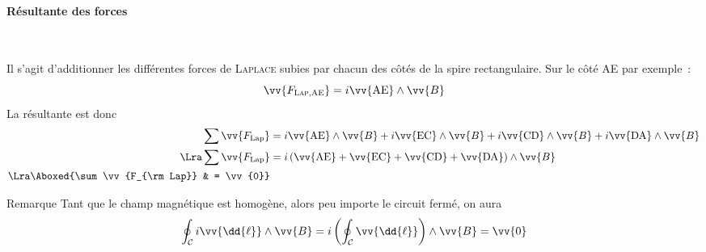 \documentclass[../main/main.tex]{subfiles}
\begin{document}
\paragraph*{Résultante des forces}~
\begin{hide}
	Il s'agit d'additionner les différentes forces de \textsc{Laplace} subies par
	chacun des côtés de la spire rectangulaire. Sur le côté AE par exemple~:
	\[
		\vv{F_{\textsc{Lap}, \rm AE}} = i \vv{\rm AE}\wedge \vv{B}
	\]
	La résultante est donc
	\begin{align*}
		\sum \vv{F_{\rm Lap}}         & =
		i \vv{\rm AE}\wedge \vv{B} +
		i \vv{\rm EC}\wedge \vv{B} +
		i \vv{\rm CD}\wedge \vv{B} +
		i \vv{\rm DA}\wedge \vv{B}
		\\\Lra
		\sum \vv{F_{\rm Lap}}         & =
		i \left( \vv{\rm AE} + \vv{\rm EC} + \vv{\rm CD} + \vv{\rm DA} \right)\wedge
		\vv{B}
		\\\Lra
		\Aboxed{\sum \vv{F_{\rm Lap}} & = \vv{0}}
	\end{align*}
\end{hide}

\begin{rexem}{Remarque}
	Tant que le champ magnétique est homogène, alors peu importe le circuit fermé,
	on aura
	\[
		\oint_{\mathcal{C}}^{} i \vv{\dd{\ell }}\wedge \vv{B} =
		i \left( \oint_{\mathcal{C}} \vv{\dd{\ell }} \right)\wedge \vv{B} = \vv{0}
	\]
\end{rexem}
\end{document}
